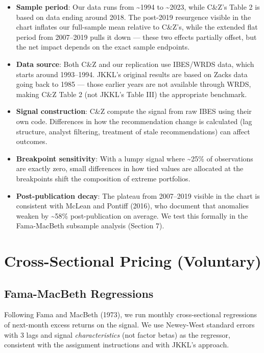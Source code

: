 \documentclass[
  letterpaper,
  DIV=11,
  numbers=noendperiod]{scrartcl}
\providecommand{\tightlist}{%
  \setlength{\itemsep}{0pt}\setlength{\parskip}{0pt}}\usepackage{longtable,booktabs,array}
\begin{document}
\begin{itemize}
\tightlist
\item
  \textbf{Sample period}: Our data runs from \textasciitilde1994 to
  \textasciitilde2023, while C\&Z's Table 2 is based on data ending
  around 2018. The post-2019 resurgence visible in the chart inflates
  our full-sample mean relative to C\&Z's, while the extended flat
  period from 2007--2019 pulls it down --- these two effects partially
  offset, but the net impact depends on the exact sample endpoints.
\item
  \textbf{Data source}: Both C\&Z and our replication use IBES/WRDS
  data, which starts around 1993--1994. JKKL's original results are
  based on Zacks data going back to 1985 --- those earlier years are not
  available through WRDS, making C\&Z Table 2 (not JKKL's Table III) the
  appropriate benchmark.
\item
  \textbf{Signal construction}: C\&Z compute the signal from raw IBES
  using their own code. Differences in how the recommendation change is
  calculated (lag structure, analyst filtering, treatment of stale
  recommendations) can affect outcomes.
\item
  \textbf{Breakpoint sensitivity}: With a lumpy signal where
  \textasciitilde25\% of observations are exactly zero, small
  differences in how tied values are allocated at the breakpoints shift
  the composition of extreme portfolios.
\item
  \textbf{Post-publication decay}: The plateau from 2007--2019 visible
  in the chart is consistent with McLean and Pontiff (2016), who
  document that anomalies weaken by \textasciitilde58\% post-publication
  on average. We test this formally in the Fama-MacBeth subsample
  analysis (Section 7).
\end{itemize}

\section{Cross-Sectional Pricing
(Voluntary)}\label{cross-sectional-pricing-voluntary}

\subsection{Fama-MacBeth Regressions}\label{fama-macbeth-regressions}

Following Fama and MacBeth (1973), we run monthly cross-sectional
regressions of next-month excess returns on the signal. We use
Newey-West standard errors with 3 lags and signal \emph{characteristics}
(not factor betas) as the regressor, consistent with the assignment
instructions and with JKKL's approach.
\end{document}
